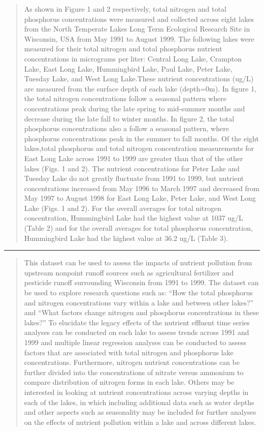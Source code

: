 \documentclass[
]{article}
\begin{document}
\begin{quote}
As shown in Figure 1 and 2 respectively, total nitrogen and total
phosphorus concentrations were measured and collected across eight lakes
from the North Temperate Lakes Long Term Ecological Research Site in
Wisconsin, USA from May 1991 to August 1999. The following lakes were
measured for their total nitrogen and total phosphorus nutrient
concentrations in micrograms per liter: Central Long Lake, Crampton
Lake, East Long Lake, Hummingbird Lake, Paul Lake, Peter Lake, Tuesday
Lake, and West Long Lake.These nutrient concentrations (ug/L) are
measured from the surface depth of each lake (depth=0m). In figure 1,
the total nitrogen concentrations follow a seasonal pattern where
concentrations peak during the late spring to mid-summer months and
decrease during the late fall to winter months. In figure 2, the total
phosphorus concentrations also a follow a seasonal pattern, where
phosphorus concentrations peak in the summer to fall months. Of the
eight lakes,total phosphorus and total nitrogen concentration
measurements for East Long Lake across 1991 to 1999 are greater than
that of the other lakes (Figs. 1 and 2). The nutrient concentrations for
Peter Lake and Tuesday Lake do not greatly fluctuate from 1991 to 1999,
but nutrient concentrations increased from May 1996 to March 1997 and
decreased from May 1997 to August 1998 for East Long Lake, Peter Lake,
and West Long Lake (Figs. 1 and 2). For the overall averages for total
nitrogen concentration, Hummingbird Lake had the highest value at 1037
ug/L (Table 2) and for the overall averages for total phosphorus
concentration, Hummingbird Lake had the highest value at 36.2 ug/L
(Table 3).
\end{quote}

\begin{center}\rule{0.5\linewidth}{0.5pt}\end{center}

\begin{quote}
This dataset can be used to assess the impacts of nutrient pollution
from upstream nonpoint runoff sources such as agricultural fertilizer
and pesticide runoff surrounding Wisconsin from 1991 to 1999. The
dataset can be used to explore research questions such as: ``How the
total phosphorus and nitrogen concentrations vary within a lake and
between other lakes?'' and ``What factors change nitrogen and phosphorus
concentrations in these lakes?'' To elucidate the legacy effects of the
nutrient effluent time series analyses can be conducted on each lake to
assess trends across 1991 and 1999 and multiple linear regression
analyses can be conducted to assess factors that are associated with
total nitrogen and phosphorus lake concentrations. Furthermore, nitrogen
nutrient concentrations can be further divided into the concentrations
of nitrate versus ammonium to compare distribution of nitrogen forms in
each lake. Others may be interested in looking at nutrient
concentrations across varying depths in each of the lakes, in which
including additional data such as water depths and other aspects such as
seasonality may be included for further analyses on the effects of
nutrient pollution within a lake and across different lakes.
\end{quote}
\end{document}
